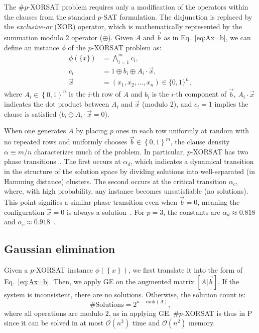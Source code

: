 The \#$p$-XORSAT problem requires only a modification of the operators within the clauses from the standard $p$-SAT formulation.
The disjunction is replaced by the \textit{exclusive-or} (XOR) operator, which is mathematically represented by the summation modulo $2$ operator ($\oplus$).
Given $A$ and $\vec{b}$ as in Eq.~\ref{eq:Ax=b}, we can define an instance $\phi$ of the $p$-XORSAT problem as:
\begin{equation}\label{eq:xorsat_def}
    \begin{split}
        \phi(\{x\}) &= \bigwedge_{i = 1}^m c_i,\\
        c_i &= 1 \oplus b_i \oplus A_i \cdot \vec{x},\\
        \vec{x} &= \left(x_1, x_2, \ldots, x_n \right) \in \{0,1\}^n,
    \end{split}
\end{equation}
where $A_i \in \left\{ 0,1 \right\}^n$ is the $i$-th row of $A$ and $b_i$ is the $i$-th component of $\vec{b}$, $A_i \cdot \vec{x}$ indicates the dot product between $A_i$ and $\vec{x}$ (modulo $2$), and $c_i = 1$ implies the clause is satisfied ($b_i \oplus A_i \cdot \vec{x} = 0$).

When one generates $A$ by placing $p$ ones in each row uniformly at random with no repeated rows and uniformly chooses $\vec{b} \in \left\{0,1 \right\}^m$, the clause density $\alpha \equiv m / n$ characterizes much of the problem.
In particular, $p$-XORSAT has two phase transitions~\cite{mezard_alternative_2002}.
The first occurs at $\alpha_d$, which indicates a dynamical transition in the structure of the solution space by dividing solutions into well-separated (in Hamming distance) clusters.
The second occurs at the critical transition $\alpha_c$, where, with high probability, any instance becomes unsatisfiable (no solutions).
This point signifies a similar phase transition even when $\vec{b} = 0$, meaning the configuration $\vec{x} = 0$ is always a solution~\cite{ricci2001simplest}.
For $p = 3$, the constants are $\alpha_d \approx 0.818$ and $\alpha_c \approx 0.918$~\cite{mezard_alternative_2002}.

\subsection{Gaussian elimination}
Given a $p$-XORSAT instance $\phi \left( \left\{x\right\} \right)$, we first translate it into the form of Eq.~\ref{eq:Ax=b}.
Then, we apply GE on the augmented matrix $[A|\vec{b}]$.
If the system is inconsistent, there are no solutions.
Otherwise, the solution count is:
\begin{equation}\label{eq:ge}
    \text{\#Solutions} = 2^{n - \mathrm{rank}(A)},
\end{equation}
where all operations are modulo $2$, as in applying GE.
\#$p$-XORSAT is thus in P since it can be solved in at most $\mathcal{O}(n^3)$ time and $\mathcal{O}(n^2)$ memory.

